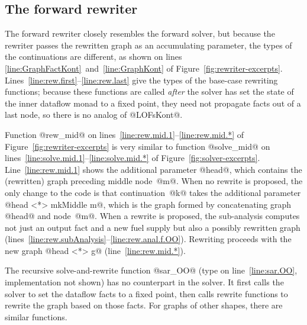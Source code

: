 \documentclass[blockstyle,preprint,natbib,nocopyrightspace]{sigplanconf}
\newcommand\lineref[1]{line~\ref{line:#1}}
\newcommand\linepairref[2]{lines \ref{line:#1}~and~\ref{line:#2}}
\newcommand\linerangeref[2]{\mbox{lines~\ref{line:#1}--\ref{line:#2}}}
\newcommand\Lineref[1]{Line~\ref{line:#1}}
\newcommand\Linerangeref[2]{\mbox{Lines~\ref{line:#1}--\ref{line:#2}}}
\newcommand{\authornote}[1]{{\em #1}}
\def\authornote#1{\unskip\relax}
\newcommand{\norman}[1]{\authornote{NR: #1}}
\let\remark\norman
\newcommand\seclabel[1]{\label{sec:#1}}
\newcommand\figref[1]{Figure~\ref{fig:#1}}
\begin{document}



\subsection{The forward rewriter}

\seclabel{forward-rewriter}

The forward rewriter closely resembles the
forward solver, but because the rewriter passes the rewritten graph as
an accumulating parameter, the types of the continuations are
different, as shown on \linepairref{GraphFactKont}{GraphKont} of
\figref{rewriter-excerpts}. 
\Linerangeref{rew.first}{rew.last} give the types of the base-case
rewriting functions; because these functions are called \emph{after}
the solver has set the state of the inner dataflow monad to a fixed
point, they need not propagate facts out of a last node, so there is
no analog of @LOFsKont@.

Function @rew_mid@ on \linerangeref{rew.mid.1}{rew.mid.*} of
\figref{rewriter-excerpts} is very similar to function @solve_mid@ on 
\linerangeref{solve.mid.1}{solve.mid.*} of \figref{solver-excerpts}.
\Lineref{rew.mid.1} shows the additional parameter @head@, which
contains the (rewritten) graph preceding middle node~@m@.
When no rewrite is proposed, the only change to the code is that
continuation~@k@ takes the additional parameter
@head <*> mkMiddle m@,
which is the graph formed by concatenating graph @head@ and node~@m@. 
When a rewrite is proposed, the sub-analysis computes not just an
output fact and a new fuel supply but also a possibly rewritten graph
(\linerangeref{rew.subAnalysis}{rew.anal.f.OO}).
Rewriting proceeds with the new graph @head <*> g@
(\lineref{rew.mid.*}).
\remark{Need to be sure that we say @<*>@ is splicing and cite ML
workshop paper}

The recursive solve-and-rewrite function @sar_OO@ (type on
\lineref{sar.OO}, implementation not shown) 
has no counterpart in the solver.
It first calls the solver to set the dataflow facts to a fixed
point, then calls rewrite functions to rewrite the graph based on
those facts.
For graphs of other shapes,
there are similar functions.
\end{document}
